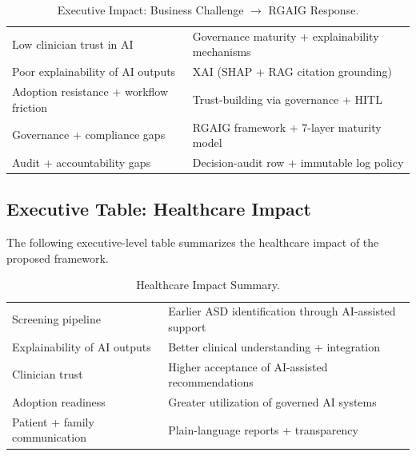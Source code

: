 {\tablestripes\tablefontsize
{}
\begin{xltabular}{\textwidth}{@{} >{\raggedright\arraybackslash}p{6cm} L @{}}
\caption[Executive Impact: Business Challenge $\rightarrow$ RGAIG Response]{Executive Impact: Business Challenge $\rightarrow$ RGAIG Response.}\label{tab:exec_executive_impact} \\
\toprule
{} &  \\
\midrule
\endfirsthead
\endhead
\bottomrule
\endlastfoot
Low clinician trust in AI & Governance maturity + explainability mechanisms \\
\addlinespace
Poor explainability of AI outputs & XAI (SHAP + RAG citation grounding) \\
\addlinespace
Adoption resistance + workflow friction & Trust-building via governance + HITL \\
\addlinespace
Governance + compliance gaps & RGAIG framework + 7-layer maturity model \\
\addlinespace
Audit + accountability gaps & Decision-audit row + immutable log policy \\
\end{xltabular}}


\subsection{Executive Table: Healthcare Impact}
\label{sec:exec_healthcare_impact}

\noindent The following executive-level table summarizes the healthcare impact of the proposed framework.

{\tablestripes\tablefontsize
{}
\begin{xltabular}{\textwidth}{@{} >{\raggedright\arraybackslash}p{6cm} L @{}}
\caption[Healthcare Impact Summary]{Healthcare Impact Summary.}\label{tab:exec_healthcare_impact} \\
\toprule
{} &  \\
\midrule
\endfirsthead
\endhead
\bottomrule
\endlastfoot
Screening pipeline & Earlier ASD identification through AI-assisted support \\
\addlinespace
Explainability of AI outputs & Better clinical understanding + integration \\
\addlinespace
Clinician trust & Higher acceptance of AI-assisted recommendations \\
\addlinespace
Adoption readiness & Greater utilization of governed AI systems \\
\addlinespace
Patient + family communication & Plain-language reports + transparency \\
\end{xltabular}}


